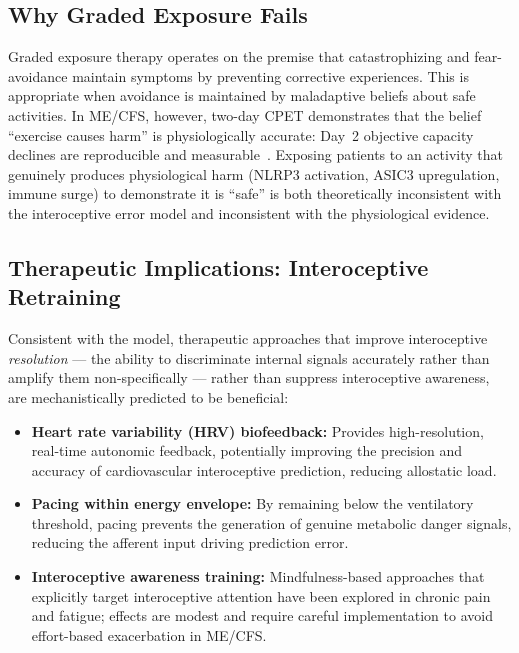 \subsection{Why Graded Exposure Fails}

Graded exposure therapy operates on the premise that catastrophizing and fear-avoidance maintain symptoms by preventing corrective experiences. This is appropriate when avoidance is maintained by maladaptive beliefs about safe activities. In ME/CFS, however, two-day CPET demonstrates that the belief ``exercise causes harm'' is physiologically accurate: Day~2 objective capacity declines are reproducible and measurable~\cite{keller2024cpet,VanCampen2020SeverityCPET}. Exposing patients to an activity that genuinely produces physiological harm (NLRP3 activation, ASIC3 upregulation, immune surge) to demonstrate it is ``safe'' is both theoretically inconsistent with the interoceptive error model and inconsistent with the physiological evidence.

\subsection{Therapeutic Implications: Interoceptive Retraining}

Consistent with the model, therapeutic approaches that improve interoceptive \emph{resolution} --- the ability to discriminate internal signals accurately rather than amplify them non-specifically --- rather than suppress interoceptive awareness, are mechanistically predicted to be beneficial:
\begin{itemize}
  \item \textbf{Heart rate variability (HRV) biofeedback:} Provides high-resolution, real-time autonomic feedback, potentially improving the precision and accuracy of cardiovascular interoceptive prediction, reducing allostatic load.
  \item \textbf{Pacing within energy envelope:} By remaining below the ventilatory threshold, pacing prevents the generation of genuine metabolic danger signals, reducing the afferent input driving prediction error.
  \item \textbf{Interoceptive awareness training:} Mindfulness-based approaches that explicitly target interoceptive attention have been explored in chronic pain and fatigue; effects are modest and require careful implementation to avoid effort-based exacerbation in ME/CFS.
\end{itemize}


